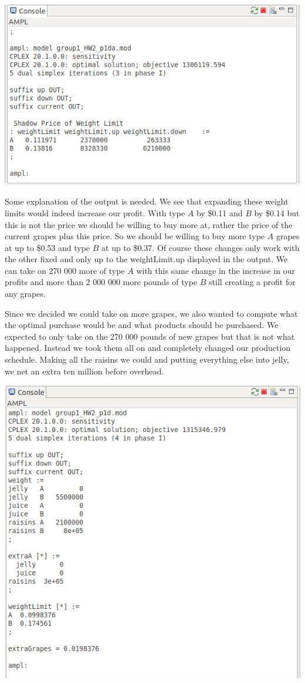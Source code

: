 \documentclass[11pt]{article}
\begin{document}
\begin{enumerate}
\begin{enumerate}
\includegraphics[width = .9\textwidth]{outputp1da.png}

Some explanation of the output is needed.  We see that expanding these weight limits would indeed increase our profit.  With type $A$ by \$0.11 and $B$ by \$0.14 but this is not the price we should be willing to buy more at, rather the price of the current grapes plus this price.  So we should be willing to buy more type $A$ grapes at up to \$0.53 and type $B$ at up to \$0.37.  Of course these changes only work with the other fixed and only up to the weightLimit.up displayed in the output.  We can take on 270 000 more of type $A$ with this same change in the increase in our profits and more than 2 000 000 more pounds of type $B$ still creating a profit for any grapes.

Since we decided we could take on more grapes, we also wanted to compute what the optimal purchase would be and what products should be purchased. We expected to only take on the 270 000 pounds of new grapes but that is not what happened.  Instead we took them all on and completely changed our production schedule.  Making all the raisins we could and putting everything else into jelly, we net an extra ten million before overhead.

\includegraphics[width=.9\textwidth]{outputp1db.png}


\end{enumerate}
\end{enumerate}
\end{document}

